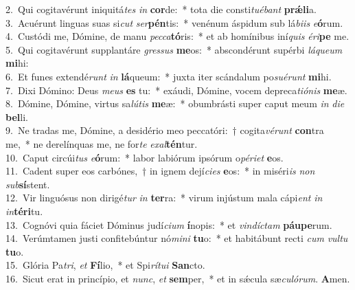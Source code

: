 {2.~}Qui cogitavérunt iniquitá\textit{tes} \textit{in} \textbf{cor}de:~* tota die consti\textit{tu}\textit{é}\textit{bant} \textbf{prǽ}\textbf{li}a.\\
{3.~}Acuérunt linguas suas si\textit{cut} \textit{ser}\textbf{pén}tis:~* venénum áspidum sub lá\textit{bi}\textit{is} \textit{e}\textbf{ó}rum.\\
{4.~}Custódi me, Dómine, de manu \textit{pec}\textit{ca}\textbf{tó}ris:~* et ab homínibus iní\textit{quis} \textit{é}\textit{ri}\textbf{pe} me.\\
{5.~}Qui cogitavérunt supplantáre \textit{gres}\textit{sus} \textbf{me}os:~* abscondérunt supérbi \textit{lá}\textit{que}\textit{um} \textbf{mi}hi:\\
{6.~}Et funes extendé\textit{runt} \textit{in} \textbf{lá}queum:~* juxta iter scándalum po\textit{su}\textit{é}\textit{runt} \textbf{mi}hi.\\
{7.~}Dixi Dómino: Deus \textit{me}\textit{us} \textbf{es} tu:~* exáudi, Dómine, vocem depreca\textit{ti}\textit{ó}\textit{nis} \textbf{me}æ.\\
{8.~}Dómine, Dómine, virtus sa\textit{lú}\textit{tis} \textbf{me}æ:~* obumbrásti super caput meum \textit{in} \textit{di}\textit{e} \textbf{bel}li.\\
{9.~}Ne tradas me, Dómine, a desidério meo peccatóri:~† cogita\textit{vé}\textit{runt} \textbf{con}tra me,~* ne derelínquas me, ne for\textit{te} \textit{e}\textit{xal}\textbf{tén}tur.\\
{10.~}Caput circúi\textit{tus} \textit{e}\textbf{ó}rum:~* labor labiórum ipsórum o\textit{pé}\textit{ri}\textit{et} \textbf{e}os.\\
{11.~}Cadent super eos carbónes,~† in ignem dejí\textit{ci}\textit{es} \textbf{e}os:~* in miséri\textit{is} \textit{non} \textit{sub}\textbf{sí}stent.\\
{12.~}Vir linguósus non dirigé\textit{tur} \textit{in} \textbf{ter}ra:~* virum injústum mala cápi\textit{ent} \textit{in} \textit{in}\textbf{té}\textbf{ri}tu.\\
{13.~}Cognóvi quia fáciet Dóminus judí\textit{ci}\textit{um} \textbf{í}nopis:~* et \textit{vin}\textit{dí}\textit{ctam} \textbf{páu}\textbf{pe}rum.\\
{14.~}Verúmtamen justi confitebúntur nó\textit{mi}\textit{ni} \textbf{tu}o:~* et habitábunt recti \textit{cum} \textit{vul}\textit{tu} \textbf{tu}o.\\
{15.~}Glória Pa\textit{tri}, \textit{et} \textbf{Fí}lio,~* et Spi\textit{rí}\textit{tu}\textit{i} \textbf{San}cto.\\
{16.~}Sicut erat in princípio, et \textit{nunc}, \textit{et} \textbf{sem}per,~* et in sǽcula sæ\textit{cu}\textit{ló}\textit{rum}. \textbf{A}men.\\
